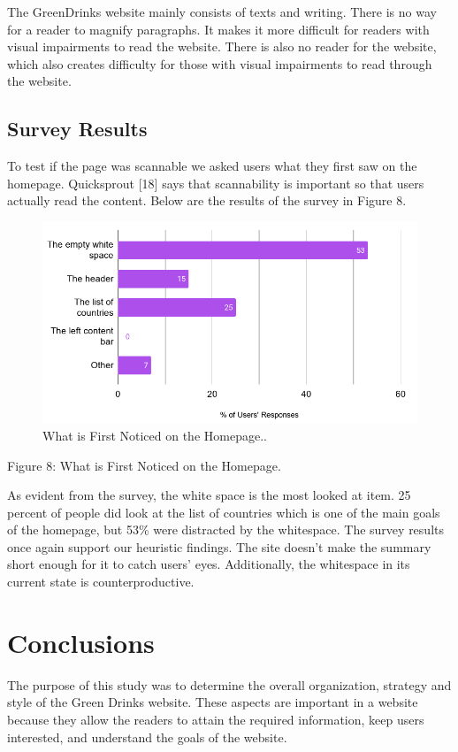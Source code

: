 \documentclass[12pt]{article}
\begin{document}
The GreenDrinks website mainly consists of texts and writing. There is no way for a reader to magnify paragraphs. It makes it more difficult for readers with visual impairments to read the website. There is also no reader for the website, which also creates difficulty for those with visual impairments to read through the website.



\subsection{Survey Results}
To test if the page was scannable we asked users what they first saw on the homepage. Quicksprout [18] says that scannability is important so that users actually read the content. Below are the results of the survey in Figure 8.
\begin{figure}[ht]
\centering
\includegraphics[width=1.0\textwidth]{f8}
\caption[What is First Noticed on the Homepage.]{What is First Noticed on the Homepage.\footnotemark.}
\end{figure}

Figure 8: What is First Noticed on the Homepage.

As evident from the survey, the white space is the most looked at item. 25 percent of people did look at the list of countries which is one of the main goals of the homepage, but 53\% were distracted by the whitespace. The survey results once again support our heuristic findings. The site doesn’t make the summary short enough for it to catch users’ eyes. Additionally, the whitespace in its current state is counterproductive.

\section{Conclusions}
The purpose of this study was to determine the overall organization, strategy and style of the Green Drinks website. These aspects are important in a website because they allow the readers to attain the required information, keep users interested, and understand the goals of the website.
\end{document}
